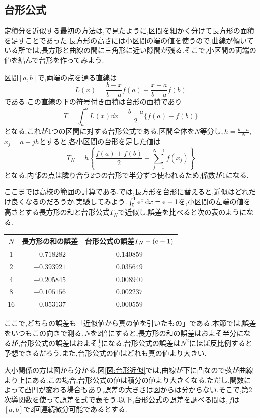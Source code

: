 \subsection{台形公式}

定積分を近似する最初の方法は,で見たように,区間を細かく分けて長方形の面積を足すことであった.長方形の高さには小区間の端の値を使うので,曲線が傾いている所では,長方形と曲線の間に三角形に近い隙間が残る.そこで,小区間の両端の値を結んで台形を作ってみよう.

区間$[a,b]$で,両端の点を通る直線は
\[
 L(x)=\frac{b-x}{b-a}f(a)+\frac{x-a}{b-a}f(b)
\]
である.この直線の下の符号付き面積は台形の面積であり
\[
 T=\int_a^bL(x)\dd x=\frac{b-a}{2}\{f(a)+f(b)\}
\]
となる.これが1つの区間に対する台形公式である.区間全体を$N$等分し,\,$h=\frac{b-a}{N}$,\,$x_j=a+jh$とすると,各小区間の台形を足した値は
\[
 T_N=h\left\{\frac{f(a)+f(b)}2+\sum_{j=1}^{N-1}f(x_j)\right\}
\]
となる.内部の点は隣り合う2つの台形で半分ずつ使われるため,係数が$1$になる.

ここまでは高校の範囲の計算である.では,長方形を台形に替えると,近似はどれだけ良くなるのだろうか.実験してみよう.\,$\int_0^1\mathrm{e}^x\,\mathrm{d} x=\mathrm{e}-1$を,小区間の左端の値を高さとする長方形の和と台形公式$T_N$で近似し,誤差を比べると次の表のようになる.
\begin{center}
\begin{tabular}{ccc}
\toprule
$N$ & 長方形の和の誤差 & 台形公式の誤差$T_N-(\mathrm{e}-1)$\\
\midrule
$1$ & $-0.718282$ & $0.140859$\\
$2$ & $-0.393921$ & $0.035649$\\
$4$ & $-0.205845$ & $0.008940$\\
$8$ & $-0.105156$ & $0.002237$\\
$16$ & $-0.053137$ & $0.000559$\\
\bottomrule
\end{tabular}
\end{center}
ここで,どちらの誤差も「近似値から真の値を引いたもの」である.本節では,誤差をいつもこの向きで測る.\,$N$を2倍にすると,長方形の和の誤差はおよそ半分になるが,台形公式の誤差はおよそ$\frac14$になる.台形公式の誤差は$N^2$にほぼ反比例すると予想できるだろう.また,台形公式の値はどれも真の値より大きい.

大小関係の方は図から分かる.図\ref{図:台形近似}では,曲線が下に凸なので弦が曲線より上にある.この場合,台形公式の値は積分の値より大きくなる.ただし,関数によって凸凹が変わる場合もあり,誤差の大きさは図からは分からない.そこで,第2次導関数を使って誤差を式で表そう.以下,台形公式の誤差を調べる間は,\,$f$は$[a,b]$で2回連続微分可能であるとする.

